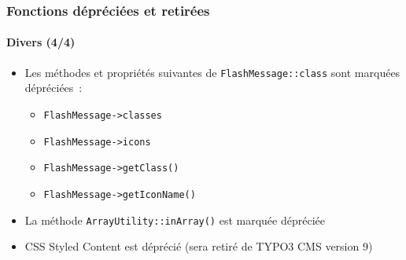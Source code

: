 \begin{frame}[fragile]
	\frametitle{Fonctions dépréciées et retirées}
	\framesubtitle{Divers (4/4)}

	\begin{itemize}

		\item Les méthodes et propriétés suivantes de \texttt{FlashMessage::class} sont
			marquées dépréciées~:

			\begin{itemize}
				\item \texttt{FlashMessage->classes}
				\item \texttt{FlashMessage->icons}
				\item \texttt{FlashMessage->getClass()}
				\item \texttt{FlashMessage->getIconName()}
			\end{itemize}

		\item La méthode \texttt{ArrayUtility::inArray()} est marquée dépréciée

		\item CSS Styled Content est déprécié\newline
			\small(sera retiré de TYPO3 CMS version 9)\normalsize

	\end{itemize}

\end{frame}

